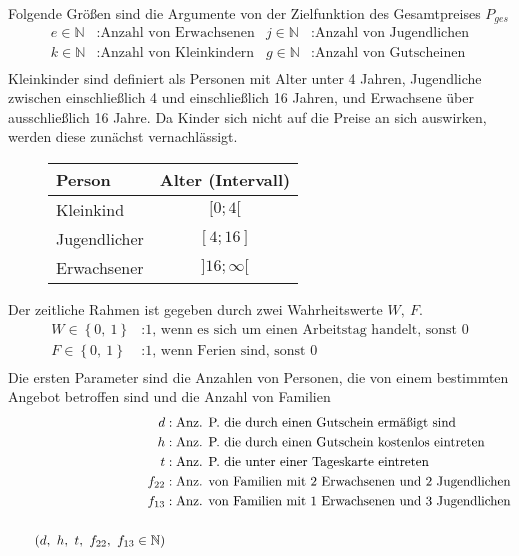 \documentclass[a4paper, 12pt]{scrartcl}
\begin{document}
Folgende Größen sind die Argumente von der Zielfunktion des Gesamtpreises $P_{ges}$
\begin{align*}
	e \in \mathbb{N}&:\text{Anzahl von Erwachsenen}  & j \in \mathbb{N}&:\text{Anzahl von Jugendlichen} \\
	k \in \mathbb{N}&:\text{Anzahl von Kleinkindern} & g \in \mathbb{N}&:\text{Anzahl von Gutscheinen} \\
\end{align*}
Kleinkinder sind definiert als Personen mit Alter unter 4 Jahren, Jugendliche zwischen einschließlich 4 und einschließlich 16 Jahren, und Erwachsene über ausschließlich 16 Jahre. Da Kinder sich nicht auf die Preise an sich auswirken, werden diese zunächst vernachlässigt.
\begin{figure}[H]
	\centering
	\begin{tabular}{lc}
		Person & Alter (Intervall) \\
		\hline
		Kleinkind & $[0;4[$ \\
		Jugendlicher & $[4;16]$ \\
		Erwachsener\footnotemark & $]16;\infty[$
	\end{tabular}
\end{figure}
Der zeitliche Rahmen ist gegeben durch zwei Wahrheitswerte $W,\ F$.
\begin{align*}
	W \in \left\{ 0,\ 1 \right\} &:\text{1, wenn es sich um einen Arbeitstag handelt, sonst 0} \\
	F \in \left\{ 0,\ 1 \right\} &:\text{1, wenn Ferien sind, sonst 0} \\
\end{align*}
Die ersten Parameter sind die Anzahlen von Personen, die von einem bestimmten Angebot betroffen sind und die Anzahl von Familien
\begin{align*}
	d &: \text{Anz. P. die durch einen Gutschein ermäßigt sind} \\
	h &: \text{Anz. P. die durch einen Gutschein kostenlos eintreten} \\
	t &: \text{Anz. P. die unter einer Tageskarte eintreten} \\
	f_{22} &: \text{Anz. von Familien mit 2 Erwachsenen und 2 Jugendlichen} \\
	f_{13} &: \text{Anz. von Familien mit 1 Erwachsenen und 3 Jugendlichen} \\\\
	\tag{$d,\ h,\ t,\ f_{22},\ f_{13} \in \mathbb{N}$}
\end{align*}
\end{document}
